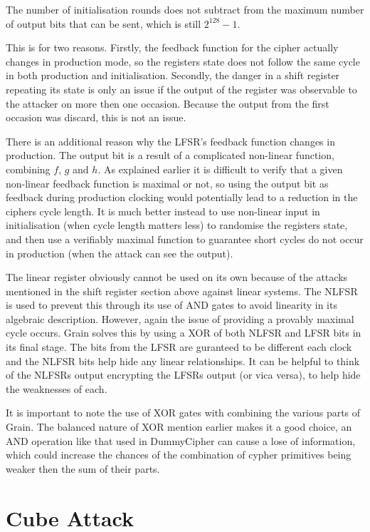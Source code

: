 \documentclass{report}
\begin{document}
The number of initialisation rounds does not subtract from the maximum number of output bits that can be sent, which is still $2^{128}-1$.

This is for two reasons. Firstly, the feedback function for the cipher actually changes in production mode, so the registers state does not follow the same cycle in both production and initialisation. Secondly, the danger in a shift register repeating its state is only an issue if the output of the register was observable to the attacker on more then one occasion. Because the output from the first occasion was discard, this is not an issue.

There is an additional reason why the LFSR's feedback function changes in production. The output bit is a result of a complicated non-linear function, combining $f$, $g$ and $h$. As explained earlier it is difficult to verify that a given non-linear feedback function is maximal or not, so using the output bit as feedback during production clocking would potentially lead to a reduction in the ciphers cycle length. It is much better instead to use non-linear input in initialisation (when cycle length matters less) to randomise the registers state, and then use a verifiably maximal function to guarantee short cycles do not occur in production (when the attack can see the output).

The linear register obviously cannot be used on its own because of the attacks mentioned in the shift register section above against linear systems. The NLFSR is used to prevent this through its use of AND gates to avoid linearity in its algebraic description. However, again the issue of providing a provably maximal cycle occurs. Grain solves this by using a XOR of both NLFSR and LFSR bits in its final stage. The bits from the LFSR are guranteed to be different each clock and the NLFSR bits help hide any linear relationships. It can be helpful to think of the NLFSRs output encrypting the LFSRs output (or vica versa), to help hide the weaknesses of each.

It is important to note the use of XOR gates with combining the various parts of Grain. The balanced nature of XOR mention earlier makes it a good choice, an AND operation like that used in DummyCipher can cause a lose of information, which could increase the chances of the combination of cypher primitives being weaker then the sum of their parts.
\chapter{Cube Attack}
\end{document}
